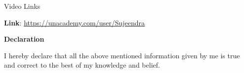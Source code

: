 \documentclass[12pt]{article}
\begin{document}

\vspace{\baselineskip}
{\fontsize{13pt}{15.6pt}\selectfont Video Links\par}\par

	 {\fontsize{13pt}{15.6pt}\selectfont \textbf{Link}: \href{https://unacademy.com/user/Sujeendra}{https://unacademy.com/user/Sujeendra}\par}\par


\vspace{\baselineskip}

\vspace{\baselineskip}
{\fontsize{14pt}{16.8pt}\selectfont \textbf{Declaration}\par}\par

{\fontsize{13pt}{15.6pt}\selectfont I hereby declare that all the above mentioned information given by me is true and correct to the best of my knowledge and belief.\par}\par
\end{document}
